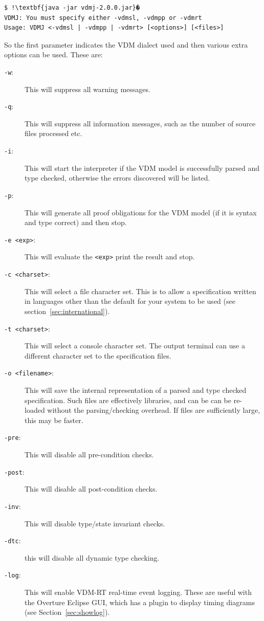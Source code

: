 \documentclass{overturerep}
\begin{document}
{\lstset{style=tool,language=}
\begin{lstlisting}
$ !\textbf{java -jar vdmj-2.0.0.jar}�
VDMJ: You must specify either -vdmsl, -vdmpp or -vdmrt
Usage: VDMJ <-vdmsl | -vdmpp | -vdmrt> [<options>] [<files>]
\end{lstlisting}
\lstset{style=mystyle}
\lstset{language=VDM++}

So the first parameter indicates the VDM dialect used and then
various extra options can be used. These are:

\begin{description}
\item[\texttt{-w}:] This will suppress all warning messages.
\item[\texttt{-q}:] This will suppress all information messages, such as
 the number of source files processed etc.
\item[\texttt{-i}:] This will start the interpreter if the VDM
  model is successfully parsed and type checked, otherwise the errors discovered
  will be listed.
\item[\texttt{-p}:] This will generate all proof obligations for the
  VDM model (if it is syntax and type correct) and then 
  stop.
\item[\texttt{-e <exp>}:] This will evaluate the \texttt{<exp>} print
  the result and stop.
\item[\texttt{-c <charset>}:] This will select a file character set. This is to
allow a specification written in languages other than the default for your system
to be used (see section~\ref{sec:international}). 
\item[\texttt{-t <charset>}:] This will select a console character set. The output
terminal can use a different character set to the specification files.
\item[\texttt{-o <filename>}:] This will save the internal
  representation of a parsed and type checked spe\-ci\-fication. Such files are
effectively libraries, and can be can be re-loaded without the
parsing/checking overhead. If files are sufficiently large, this may be faster.
\item[\texttt{-pre}:] This will disable all pre-condition checks.
\item[\texttt{-post}:] This will disable all post-condition checks.
\item[\texttt{-inv}:] This will disable type/state invariant checks.
\item[\texttt{-dtc}:] this will disable all dynamic type checking.
\item[\texttt{-log}:] This will enable VDM-RT real-time event logging. These
  are useful with the Overture Eclipse GUI, which has a plugin to
  display timing diagrams (see Section~\ref{sec:showlog}).
\end{description}

}
\end{document}
